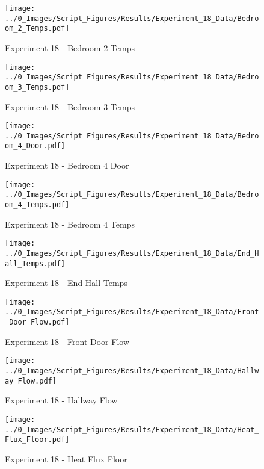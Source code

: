 	\begin{figure}[H]
		\centering
		\texttt{[image: ../0\_Images/Script\_Figures/Results/Experiment\_18\_Data/Bedroom\_2\_Temps.pdf]}
		\caption[]{Experiment 18 - Bedroom 2 Temps}
	\end{figure}
 
	\clearpage

	\begin{figure}[H]
		\centering
		\texttt{[image: ../0\_Images/Script\_Figures/Results/Experiment\_18\_Data/Bedroom\_3\_Temps.pdf]}
		\caption[]{Experiment 18 - Bedroom 3 Temps}
	\end{figure}
 

	\begin{figure}[H]
		\centering
		\texttt{[image: ../0\_Images/Script\_Figures/Results/Experiment\_18\_Data/Bedroom\_4\_Door.pdf]}
		\caption[]{Experiment 18 - Bedroom 4 Door}
	\end{figure}
 
	\clearpage

	\begin{figure}[H]
		\centering
		\texttt{[image: ../0\_Images/Script\_Figures/Results/Experiment\_18\_Data/Bedroom\_4\_Temps.pdf]}
		\caption[]{Experiment 18 - Bedroom 4 Temps}
	\end{figure}
 

	\begin{figure}[H]
		\centering
		\texttt{[image: ../0\_Images/Script\_Figures/Results/Experiment\_18\_Data/End\_Hall\_Temps.pdf]}
		\caption[]{Experiment 18 - End Hall Temps}
	\end{figure}
 
	\clearpage

	\begin{figure}[H]
		\centering
		\texttt{[image: ../0\_Images/Script\_Figures/Results/Experiment\_18\_Data/Front\_Door\_Flow.pdf]}
		\caption[]{Experiment 18 - Front Door Flow}
	\end{figure}
 

	\begin{figure}[H]
		\centering
		\texttt{[image: ../0\_Images/Script\_Figures/Results/Experiment\_18\_Data/Hallway\_Flow.pdf]}
		\caption[]{Experiment 18 - Hallway Flow}
	\end{figure}
 
	\clearpage

	\begin{figure}[H]
		\centering
		\texttt{[image: ../0\_Images/Script\_Figures/Results/Experiment\_18\_Data/Heat\_Flux\_Floor.pdf]}
		\caption[]{Experiment 18 - Heat Flux Floor}
	\end{figure}
 

